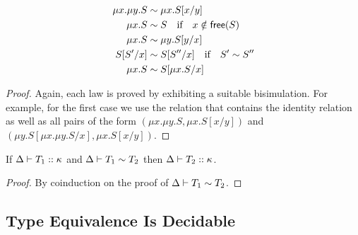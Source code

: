 \begin{lemma}
\label{lemma:mu-laws}
  \begin{align*}
    \mu x. \mu y. S \sim&\; \mu x. S[{x}/{y}]
    \\
    \mu x.S \sim&\; S \quad\text{if}\quad x \notin \mathsf{free} (S)
    \\
    \mu x.S \sim&\; \mu y.S [{y}/{x}]
    \\
    S[{S'}/{x}] \sim&\; S[{S''}/{x}] \quad\text{if}\quad S' \sim S''
    \\
    \mu x.S \sim&\; S[{\mu x.S}/{x}]
  \end{align*}
\end{lemma}
%
\begin{proof}
  Again, each law is proved by exhibiting a suitable bisimulation. For
  example, for the first case we use the relation that contains the
  identity relation as well as all pairs of the form
  $(\mu x. \mu y. S, \mu x. S[x/y])$ and
  $(\mu y.S[\mu x. \mu y. S/x], \mu x. S[x/y])$.
\end{proof}


\begin{lemma}
  \label{lem:equiv-preserves-kinding}
  If $\Delta \vdash T_1::\kappa$ and $\Delta \vdash T_1 \sim T_2$
  then $\Delta \vdash T_2::\kappa$.  
\end{lemma}

\begin{proof}
  By coinduction on the proof of $\Delta \vdash T_1 \sim T_2$.
\end{proof}


\subsection{Type Equivalence Is Decidable}
\label{sec:decidability}

